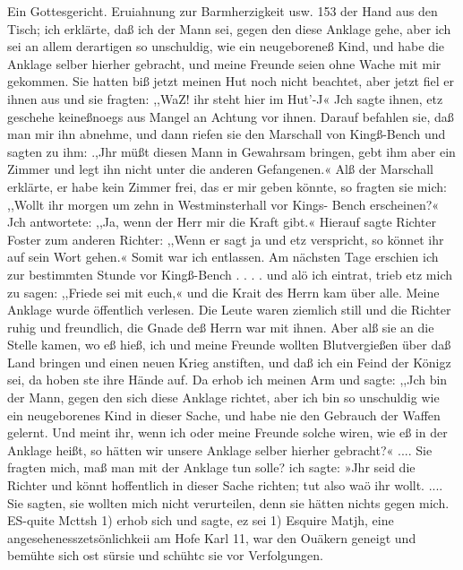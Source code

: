 Ein Gottesgericht. Eruiahnung zur Barmherzigkeit usw. 153
der Hand aus den Tisch; ich erklärte, daß ich der Mann sei,
gegen den diese Anklage gehe, aber ich sei an allem derartigen
so unschuldig, wie ein neugeboreneß Kind, und habe die Anklage
selber hierher gebracht, und meine Freunde seien ohne Wache mit
mir gekommen. Sie hatten biß jetzt meinen Hut noch nicht
beachtet, aber jetzt fiel er ihnen aus und sie fragten: ,,WaZ! ihr
steht hier im Hut'-J« Jch sagte ihnen, etz geschehe keineßnoegs
aus Mangel an Achtung vor ihnen. Darauf befahlen sie, daß
man mir ihn abnehme, und dann riefen sie den Marschall von
Kingß-Bench und sagten zu ihm: .,Jhr müßt diesen Mann in
Gewahrsam bringen, gebt ihm aber ein Zimmer und legt ihn nicht
unter die anderen Gefangenen.« Alß der Marschall erklärte, er
habe kein Zimmer frei, das er mir geben könnte, so fragten sie
mich: ,,Wollt ihr morgen um zehn in Westminsterhall vor Kings-
Bench erscheinen?« Jch antwortete: ,,Ja, wenn der Herr mir die
Kraft gibt.« Hierauf sagte Richter Foster zum anderen Richter:
,,Wenn er sagt ja und etz verspricht, so könnet ihr auf sein Wort
gehen.« Somit war ich entlassen. Am nächsten Tage erschien
ich zur bestimmten Stunde vor Kingß-Bench . . . . und alö ich
eintrat, trieb etz mich zu sagen: ,,Friede sei mit euch,« und die
Krait des Herrn kam über alle. Meine Anklage wurde öffentlich
verlesen. Die Leute waren ziemlich still und die Richter ruhig
und freundlich, die Gnade deß Herrn war mit ihnen. Aber alß
sie an die Stelle kamen, wo eß hieß, ich und meine Freunde
wollten Blutvergießen über daß Land bringen und einen neuen
Krieg anstiften, und daß ich ein Feind der Königz sei, da hoben
ste ihre Hände auf. Da erhob ich meinen Arm und sagte: ,,Jch
bin der Mann, gegen den sich diese Anklage richtet, aber ich bin
so unschuldig wie ein neugeborenes Kind in dieser Sache, und
habe nie den Gebrauch der Waffen gelernt. Und meint ihr, wenn
ich oder meine Freunde solche wiren, wie eß in der Anklage
heißt, so hätten wir unsere Anklage selber hierher gebracht?« ....
Sie fragten mich, maß man mit der Anklage tun solle? ich sagte:
»Jhr seid die Richter und könnt hoffentlich in dieser Sache
richten; tut also waö ihr wollt. ....
Sie sagten, sie wollten mich nicht verurteilen, denn sie hätten
nichts gegen mich. ES-quite Mcttsh 1) erhob sich und sagte, ez sei
1) Esquire Matjh, eine angesehenesszetsönlichkeii am Hofe Karl 11, war den
Ouäkern geneigt und bemühte sich ost sürsie und schühtc sie vor Verfolgungen.



